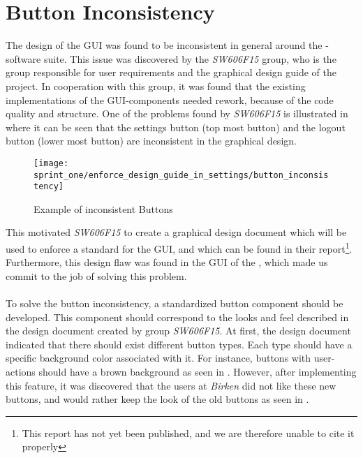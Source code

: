 \section{Button Inconsistency}
\label{sub:button_inconsistency}

The design of the GUI was found to be inconsistent in general around the \giraf-software suite. This issue was discovered by the \emph{SW606F15} group, who is the group responsible for user requirements and the graphical design guide of the project. In cooperation with this group, it was found that the existing implementations of the GUI-components needed rework, because of the code quality and structure.  One of the problems found by \emph{SW606F15} is illustrated in  where it can be seen that the settings button (top most button) and the logout button (lower most button) are inconsistent in the graphical design.

\begin{figure}[!htbp]
    \centering
    \texttt{[image: sprint\_one/enforce\_design\_guide\_in\_settings/button\_inconsistency]}
    \caption{Example of inconsistent Buttons}
    \label{fig:button_inconsistency}
\end{figure}

This motivated \emph{SW606F15} to create a graphical design document which will be used to enforce a standard for the GUI, and which can be found in their report\footnote{This report has not yet been published, and we are therefore unable to cite it properly}. Furthermore, this design flaw was found in the GUI of the \launcher, which made us commit to the job of solving this problem.
\\\\
To solve the button inconsistency, a standardized button component should be developed. This component should correspond to the looks and feel described in the design document created by group \emph{SW606F15}. At first, the design document indicated that there should exist different button types. Each type should have a specific background color associated with it. For instance, buttons with user-actions should have a brown background as seen in . However, after implementing this feature, it was discovered that the users at \emph{Birken} did not like these new buttons, and would rather keep the look of the old buttons as seen in . 


